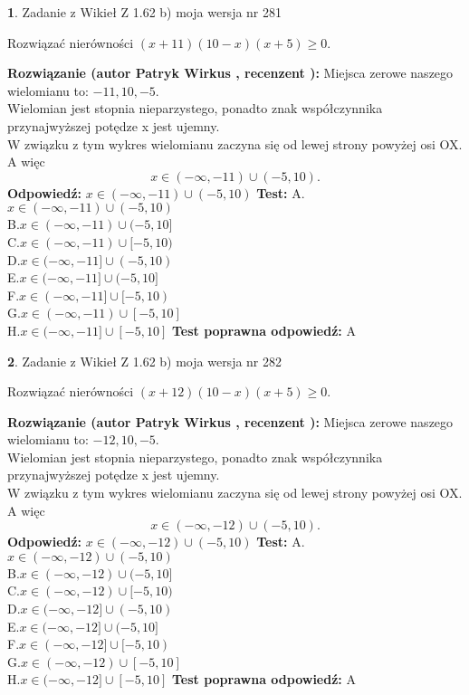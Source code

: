 \documentclass[12pt, a4paper]{article}
\theoremstyle{definition} %
\newtheorem{zad}{}
\newcommand{\zadStart}[1]{\begin{zad}#1\newline}
\newcommand{\zadStop}{\end{zad}}
\newcommand{\rozwStart}[2]{\noindent \textbf{Rozwiązanie (autor #1 , recenzent #2): }\newline}
\newcommand{\rozwStop}{\newline}
\newcommand{\odpStart}{\noindent \textbf{Odpowiedź:}\newline}
\newcommand{\odpStop}{\newline}
\newcommand{\testStart}{\noindent \textbf{Test:}\newline}
\newcommand{\testStop}{\newline}
\newcommand{\kluczStart}{\noindent \textbf{Test poprawna odpowiedź:}\newline}
\newcommand{\kluczStop}{\newline}
\begin{document}
\zadStart{Zadanie z Wikieł Z 1.62 b) moja wersja nr 281}

Rozwiązać nierówności $(x+11)(10-x)(x+5)\ge0$.
\zadStop
\rozwStart{Patryk Wirkus}{}
Miejsca zerowe naszego wielomianu to: $-11, 10, -5$.\\
Wielomian jest stopnia nieparzystego, ponadto znak współczynnika przy\linebreak najwyższej potędze x jest ujemny.\\ W związku z tym wykres wielomianu zaczyna się od lewej strony powyżej osi OX. A więc $$x \in (-\infty,-11) \cup (-5,10).$$
\rozwStop
\odpStart
$x \in (-\infty,-11) \cup (-5,10)$
\odpStop
\testStart
A.$x \in (-\infty,-11) \cup (-5,10)$\\
B.$x \in (-\infty,-11) \cup (-5,10]$\\
C.$x \in (-\infty,-11) \cup [-5,10)$\\
D.$x \in (-\infty,-11] \cup (-5,10)$\\
E.$x \in (-\infty,-11] \cup (-5,10]$\\
F.$x \in (-\infty,-11] \cup [-5,10)$\\
G.$x \in (-\infty,-11) \cup [-5,10]$\\
H.$x \in (-\infty,-11] \cup [-5,10]$
\testStop
\kluczStart
A
\kluczStop



\zadStart{Zadanie z Wikieł Z 1.62 b) moja wersja nr 282}

Rozwiązać nierówności $(x+12)(10-x)(x+5)\ge0$.
\zadStop
\rozwStart{Patryk Wirkus}{}
Miejsca zerowe naszego wielomianu to: $-12, 10, -5$.\\
Wielomian jest stopnia nieparzystego, ponadto znak współczynnika przy\linebreak najwyższej potędze x jest ujemny.\\ W związku z tym wykres wielomianu zaczyna się od lewej strony powyżej osi OX. A więc $$x \in (-\infty,-12) \cup (-5,10).$$
\rozwStop
\odpStart
$x \in (-\infty,-12) \cup (-5,10)$
\odpStop
\testStart
A.$x \in (-\infty,-12) \cup (-5,10)$\\
B.$x \in (-\infty,-12) \cup (-5,10]$\\
C.$x \in (-\infty,-12) \cup [-5,10)$\\
D.$x \in (-\infty,-12] \cup (-5,10)$\\
E.$x \in (-\infty,-12] \cup (-5,10]$\\
F.$x \in (-\infty,-12] \cup [-5,10)$\\
G.$x \in (-\infty,-12) \cup [-5,10]$\\
H.$x \in (-\infty,-12] \cup [-5,10]$
\testStop
\kluczStart
A
\kluczStop
\end{document}
